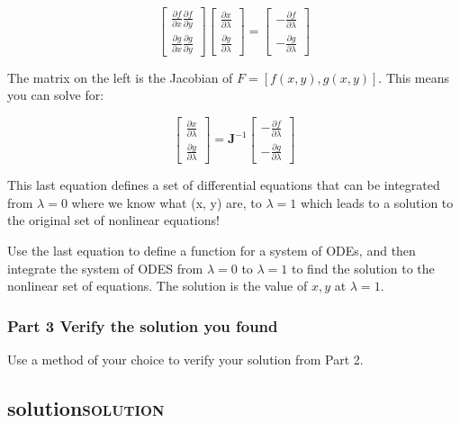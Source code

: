 \documentclass[11pt]{article}
\begin{document}
\begin{equation}
\left[\begin{array}{cc}
\frac{\partial f}{\partial x} \frac{\partial f}{\partial y} \\
\frac{\partial g}{\partial x} \frac{\partial g}{\partial y}
\end{array}\right]
\left[\begin{array}{c}
\frac{\partial x}{\partial \lambda}\\
\frac{\partial y}{\partial \lambda}
\end{array}\right]
=
\left[\begin{array}{c}
-\frac{\partial f}{\partial \lambda}\\
-\frac{\partial g}{\partial \lambda}
\end{array}\right]
\end{equation}

The matrix on the left is the Jacobian of \(F = [f(x,y), g(x, y)]\). This means you can solve for:

\[\left[\begin{array}{c}
\frac{\partial x}{\partial \lambda}\\
\frac{\partial y}{\partial \lambda}
\end{array}\right]
=
\mathbf{J}^{-1}
\left[\begin{array}{c}
-\frac{\partial f}{\partial \lambda}\\
-\frac{\partial g}{\partial \lambda}
\end{array}\right]\]

This last equation defines a set of differential equations that can be integrated from \(\lambda=0\) where we know what (x, y) are, to \(\lambda=1\) which leads to a solution to the original set of nonlinear equations!

Use the last equation to define a function for a system of ODEs, and then integrate the system of ODES from \(\lambda=0\) to \(\lambda=1\) to find the solution to the nonlinear set of equations. The solution is the value of \(x, y\) at \(\lambda=1\).

\subsubsection{Part 3 Verify the solution you found}
\label{sec:org8cd0081}

Use a method of your choice to verify your solution from Part 2.


\subsection{solution\hfill{}\textsc{solution}}
\label{sec:org0f999b4}
\end{document}
